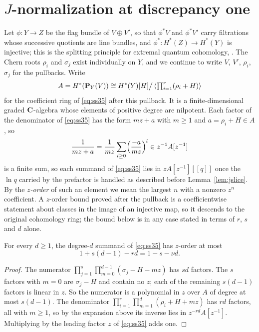 \section{\texorpdfstring{\(J\)}{J}-normalization at discrepancy one}
\label{sec:normalization}

Let \(\phi\colon Y\to Z\) be the flag bundle of \(V\oplus V'\), so that
\(\phi^{*}V\) and \(\phi^{*}V'\) carry filtrations whose successive quotients
are line bundles, and \(\phi^{*}\colon H^{*}(Z)\to H^{*}(Y)\) is injective;
this is the splitting principle for extremal quantum cohomology,
\cite[Corollary~4.3]{SS}.  The Chern roots \(\rho_{i}\) and \(\sigma_{j}\)
exist individually on \(Y\), and we continue to write \(V\), \(V'\),
\(\rho_{i}\), \(\sigma_{j}\) for the pullbacks.  Write
\[
  A=H^{*}(\mathbf P_{Y}(V))
   \cong H^{*}(Y)[H]\big/\left\langle
     \textstyle\prod_{i=1}^{r}(\rho_i+H)\right\rangle
\]
for the coefficient ring of \eqref{eq:ss35} after this pullback.  It is a
finite-dimensional graded \(\mathbf C\)-algebra whose elements of positive degree are
nilpotent.  Each factor of the denominator of \eqref{eq:ss35} has the
form \(mz+a\) with \(m\ge1\) and \(a=\rho_{i}+H\in A\), so
\[
  \frac1{mz+a}
  =\frac1{mz}\sum_{l\ge0}\Bigl(\frac{-a}{mz}\Bigr)^{l}\in z^{-1}A[z^{-1}]
\]
is a finite sum, so each summand of \eqref{eq:ss35} lies in
\(zA[z^{-1}][[q]]\) once the \(\ln q\) carried by the prefactor is handled as
described before Lemma~\ref{lem:jslice}.
By the \emph{\(z\)-order} of such an element we mean the largest \(n\) with a
nonzero \(z^{n}\) coefficient.  A \(z\)-order bound proved after the pullback
is a coefficientwise statement about classes in the image of an injective
map, so it descends to the original cohomology ring; the bound below is in
any case stated in terms of \(r\), \(s\) and \(d\) alone.

\begin{lemma}
  \label{lem:order}
  For every \(d\ge1\), the degree-\(d\) summand of \eqref{eq:ss35} has
  \(z\)-order at most
  \[
    1+s(d-1)-rd=1-s-\nu d .
  \]
\end{lemma}

\begin{proof}
  The numerator \(\prod_{j=1}^{s}\prod_{m=0}^{d-1}(\sigma_{j}-H-mz)\) has
  \(sd\) factors.  The \(s\) factors with \(m=0\) are \(\sigma_{j}-H\) and
  contain no \(z\); each of the remaining \(s(d-1)\) factors is linear in
  \(z\).  So the numerator is a polynomial in \(z\) over \(A\) of degree at
  most \(s(d-1)\).  The denominator \(\prod_{i=1}^{r}\prod_{m=1}^{d}(\rho_{i}
  +H+mz)\) has \(rd\) factors, all with \(m\ge1\), so by the expansion above
  its inverse lies in \(z^{-rd}A[z^{-1}]\).  Multiplying by the leading
  factor \(z\) of \eqref{eq:ss35} adds one.
\end{proof}

